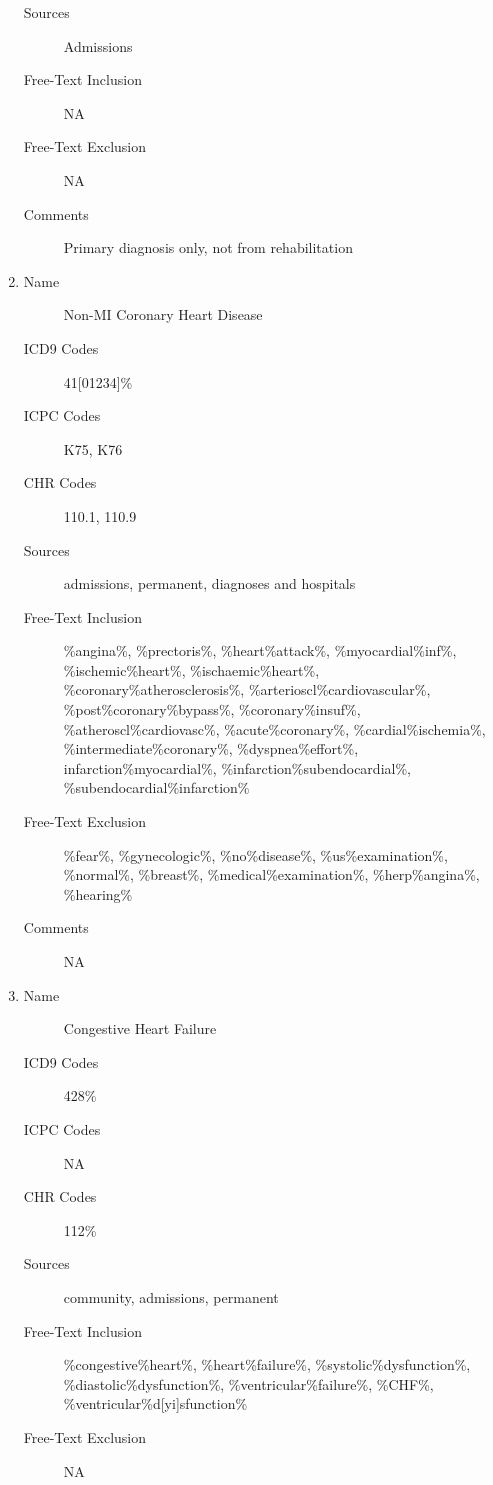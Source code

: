 \documentclass[a4paper,12pt]{article}
\begin{document}
\begin{appendices}
\begin{enumerate}
\begin{description}
   						\item[Sources] Admissions
   						\item[Free-Text Inclusion] NA
   						\item[Free-Text Exclusion] NA
   						\item[Comments] Primary diagnosis only, not from rehabilitation
   					\end{description}
   					\item 
   					\begin{description}
   						\item[Name] Non-MI Coronary Heart Disease
   						\item[ICD9 Codes] 41[01234]\%
   						\item[ICPC Codes] K75, K76
   						\item[CHR Codes] 110.1, 110.9
   						\item[Sources] admissions, permanent, diagnoses  and hospitals
   						\item[Free-Text Inclusion] \%angina\%, \%prectoris\%, \%heart\%attack\%, \%myocardial\%inf\%, \%ischemic\%heart\%, \%ischaemic\%heart\%, \%coronary\%atherosclerosis\%, \%arterioscl\%cardiovascular\%, \%post\%coronary\%bypass\%, \%coronary\%insuf\%, \%atheroscl\%cardiovasc\%, \%acute\%coronary\%, \%cardial\%ischemia\%, \%intermediate\%coronary\%, \%dyspnea\%effort\%, infarction\%myocardial\%, \%infarction\%subendocardial\%, \%subendocardial\%infarction\%
   						\item[Free-Text Exclusion] \%fear\%, \%gynecologic\%, \%no\%disease\%, \%us\%examination\%, \%normal\%, \%breast\%, \%medical\%examination\%, \%herp\%angina\%, \%hearing\%
   						\item[Comments] NA
   					\end{description}
   					\item
   					\begin{description}
   						\item[Name] Congestive Heart Failure
   						\item[ICD9 Codes] 428\%
   						\item[ICPC Codes] NA
   						\item[CHR Codes] 112\%
   						\item[Sources] community, admissions, permanent
   						\item[Free-Text Inclusion] \%congestive\%heart\%, \%heart\%failure\%, \%systolic\%dysfunction\%, \%diastolic\%dysfunction\%, \%ventricular\%failure\%, \%CHF\%, \%ventricular\%d[yi]sfunction\%
   						\item[Free-Text Exclusion] NA

\end{description}
\end{enumerate}
\end{appendices}
\end{document}
